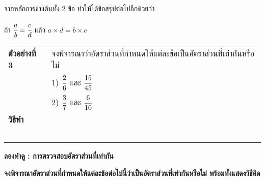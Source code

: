 \documentclass[
  a4paper,
  DIV=11,
  numbers=noendperiod]{scrartcl}
\begin{document}
\flushleft

จากหลักการข้างต้นทั้ง 2 ข้อ ทำให้ได้ข้อสรุปต่อไปอีกด้วยว่า

\centering
\begin{tcolorbox}[colback=white!5!white,
colframe=red!70!black,width=7cm]

ถ้า $\cfrac{a}{b}=\cfrac{c}{d}$ แล้ว $a\times d=b\times c$

\end{tcolorbox}

\flushleft

\renewcommand{\arraystretch}{1.5}

\begin{longtable*}[l]{lp{13cm}}

\textbf{ตัวอย่างที่ 3} & จงพิจารณาว่าอัตราส่วนที่กำหนดให้แต่ละข้อเป็นอัตราส่วนที่เท่ากันหรือไม่ \\
                  & 1) $\cfrac{2}{6}$ และ $\cfrac{15}{45}$ \\
                  & 2) $\cfrac{3}{7}$ และ $\cfrac{6}{10}$ \\

\textbf{วิธีทำ}     &   \dotfill  \\   
                  &   \dotfill  \\      
                  &   \dotfill  \\      
                  &   \dotfill  \\ 
                  &   \dotfill  \\
                  &   \dotfill  \\  
          
                              
\end{longtable*}

\centering

\begin{tcolorbox}[colback=white!5!white,
colframe=red!70!black,width=8cm]
\centering \textbf{ลองทำดู : การตรวจสอบอัตราส่วนที่เท่ากัน}
\end{tcolorbox}

\flushleft

\textbf{จงพิจารณาอัตราส่วนที่กำหนดให้แต่ละข้อต่อไปนี้ว่าเป็นอัตราส่วนที่เท่ากันหรือไม่ พร้อมทั้งแสดงวิธีคิด}

\renewcommand{\arraystretch}{2.2}
\end{document}
